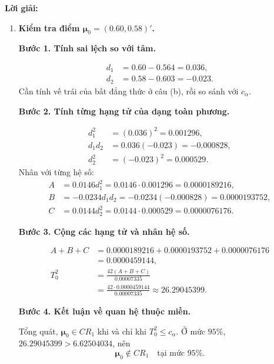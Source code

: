 \documentclass[11pt,a4paper]{article}
\renewcommand{\boldsymbol}[1]{\symbf{#1}}
\newenvironment{solution}{%
  \par\medskip\noindent\textbf{Lời giải:}\par\nobreak\smallskip\noindent\ignorespaces
}{\par}
\newcommand{\answer}[1]{\boxed{#1}}
\newcommand{\step}[2]{\par\medskip\noindent\textbf{Bước #1. #2}\par\nopagebreak[4]\smallskip\noindent}
\begin{document}
\begin{solution}
\begin{enumerate}[label=\textbf{\alph*)}]
\[\begin{pmatrix}0.0146d_1-0.0117d_2\\-0.0117d_1+0.0144d_2\end{pmatrix}.
\]
Sau đó nhân với $\mathbf{d}'$:
\begin{align*}
\mathbf{d}'\mathbf{S}^{-1}\mathbf{d}
&=\frac{d_1(0.0146d_1-0.0117d_2)
+d_2(-0.0117d_1+0.0144d_2)}{0.00007335}\\
&=\frac{0.0146d_1^2-0.0234d_1d_2+0.0144d_2^2}{0.00007335}.
\end{align*}
Nhân với $n=42$. Miền cần tìm là tập các $\boldsymbol{\mu}$ thỏa
\[
\answer{\frac{42}{0.00007335}
\left(0.0146d_1^2-0.0234d_1d_2+0.0144d_2^2\right)\le c_\alpha}.
\]
Đây là ellipse tâm $(0.564,0.603)'$ vì $\mathbf{S}$ xác định dương.
\item \textbf{Kiểm tra điểm $\boldsymbol{\mu}_0=(0.60,0.58)'$.}\par\nopagebreak[4]
\step{1}{Tính sai lệch so với tâm.}
\begin{align*}
d_1&=0.60-0.564=0.036,\\
d_2&=0.58-0.603=-0.023.
\end{align*}
Cần tính vế trái của bất đẳng thức ở câu (b), rồi so sánh với $c_\alpha$.
\step{2}{Tính từng hạng tử của dạng toàn phương.}
\begin{align*}
d_1^2&=(0.036)^2=0.001296,\\
d_1d_2&=0.036(-0.023)=-0.000828,\\
d_2^2&=(-0.023)^2=0.000529.
\end{align*}
Nhân với từng hệ số:
\begin{align*}
A&=0.0146d_1^2=0.0146\cdot0.001296=0.0000189216,\\
B&=-0.0234d_1d_2=-0.0234(-0.000828)=0.0000193752,\\
C&=0.0144d_2^2=0.0144\cdot0.000529=0.0000076176.
\end{align*}
\step{3}{Cộng các hạng tử và nhân hệ số.}
\begin{align*}
A+B+C&=0.0000189216+0.0000193752+0.0000076176\\
&=0.0000459144,\\
T_0^2&=\frac{42(A+B+C)}{0.00007335}\\
&=\frac{42\cdot0.0000459144}{0.00007335}
\approx26.29045399.
\end{align*}
\step{4}{Kết luận về quan hệ thuộc miền.}
Tổng quát, $\boldsymbol{\mu}_0\in CR_1$ khi và chỉ khi $T_0^2\le c_\alpha$.
Ở mức $95\%$, $26.29045399>6.62504034$, nên
\[
\answer{\boldsymbol{\mu}_0\notin CR_1\quad\text{tại mức }95\%.}
\]
\end{enumerate}
\end{solution}
\end{document}
